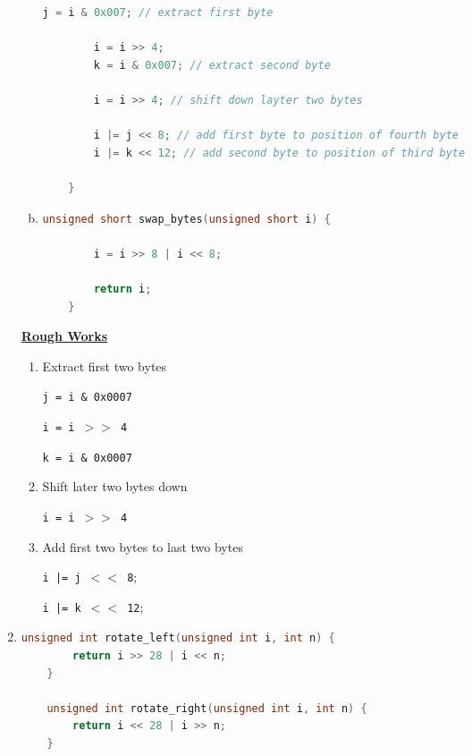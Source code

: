 \documentclass[12pt]{article}
\begin{document}
\begin{enumerate}[1.]
\begin{enumerate}[a)]
\begin{lstlisting}[language=c]
        j = i & 0x007; // extract first byte

        i = i >> 4;
        k = i & 0x007; // extract second byte

        i = i >> 4; // shift down layter two bytes

        i |= j << 8; // add first byte to position of fourth byte
        i |= k << 12; // add second byte to position of third byte

    }
\end{lstlisting}

        \item

\begin{lstlisting}[language=c]
    unsigned short swap_bytes(unsigned short i) {

        i = i >> 8 | i << 8;

        return i;
    }
\end{lstlisting}

    \end{enumerate}

    \bigskip

    \underline{\textbf{Rough Works}}

    \bigskip

    \begin{enumerate}[1.]
        \item Extract first two bytes

        \bigskip

        \texttt{j = i \& 0x0007}

        \texttt{i = i $>>$ 4}

        \texttt{k = i \& 0x0007}

        \bigskip

        \item Shift later two bytes down

        \bigskip

        \texttt{i = i $>>$ 4}

        \bigskip

        \item Add first two bytes to last two bytes

        \bigskip

        \texttt{i |= j $<<$ 8};

        \texttt{i |= k $<<$ 12};

        \bigskip

    \end{enumerate}

    \item

\begin{lstlisting}[language=c]
    unsigned int rotate_left(unsigned int i, int n) {
        return i >> 28 | i << n;
    }

    unsigned int rotate_right(unsigned int i, int n) {
        return i << 28 | i >> n;
    }
\end{lstlisting}


\end{enumerate}
\end{document}

